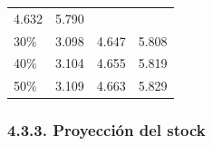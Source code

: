 \documentclass[
  spanish,
]{article}
\begin{document}
\begin{longtable}[]{@{}llll@{}}
\begin{minipage}[t]{0.14\columnwidth}
4.632\strut
\end{minipage} & \begin{minipage}[t]{0.14\columnwidth}\raggedright
5.790\strut
\end{minipage}\tabularnewline
\begin{minipage}[t]{0.17\columnwidth}\raggedright
30\%\strut
\end{minipage} & \begin{minipage}[t]{0.14\columnwidth}\raggedright
3.098\strut
\end{minipage} & \begin{minipage}[t]{0.14\columnwidth}\raggedright
4.647\strut
\end{minipage} & \begin{minipage}[t]{0.14\columnwidth}\raggedright
5.808\strut
\end{minipage}\tabularnewline
\begin{minipage}[t]{0.17\columnwidth}\raggedright
40\%\strut
\end{minipage} & \begin{minipage}[t]{0.14\columnwidth}\raggedright
3.104\strut
\end{minipage} & \begin{minipage}[t]{0.14\columnwidth}\raggedright
4.655\strut
\end{minipage} & \begin{minipage}[t]{0.14\columnwidth}\raggedright
5.819\strut
\end{minipage}\tabularnewline
\begin{minipage}[t]{0.17\columnwidth}\raggedright
50\%\strut
\end{minipage} & \begin{minipage}[t]{0.14\columnwidth}\raggedright
3.109\strut
\end{minipage} & \begin{minipage}[t]{0.14\columnwidth}\raggedright
4.663\strut
\end{minipage} & \begin{minipage}[t]{0.14\columnwidth}\raggedright
5.829\strut
\end{minipage}\tabularnewline
\bottomrule
\end{longtable}

\normalsize

\pagebreak

\hypertarget{proyecciuxf3n-del-stock}{%
\subsubsection{4.3.3. Proyección del
stock}\label{proyecciuxf3n-del-stock}}
\end{document}
